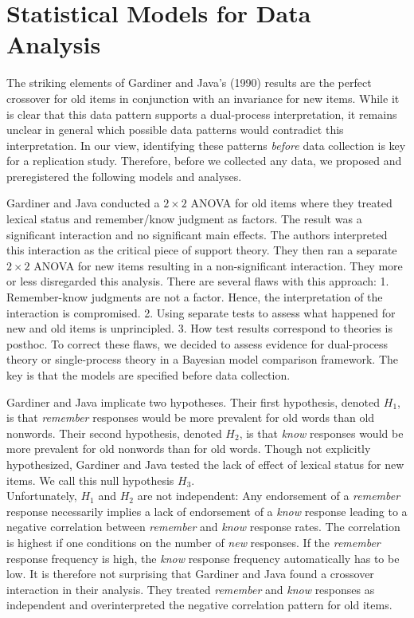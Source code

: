 \documentclass[english,,man]{apa6}
\begin{document}
\hypertarget{statistical-models-for-data-analysis}{%
\section{Statistical Models for Data Analysis}\label{statistical-models-for-data-analysis}}

The striking elements of Gardiner and Java's (1990) results are the perfect crossover for old items in conjunction with an invariance for new items. While it is clear that this data pattern supports a dual-process interpretation, it remains unclear in general which possible data patterns would contradict this interpretation. In our view, identifying these patterns \emph{before} data collection is key for a replication study. Therefore, before we collected any data, we proposed and preregistered the following models and analyses.

Gardiner and Java conducted a \(2\times 2\) ANOVA for old items where they treated lexical status and remember/know judgment as factors. The result was a significant interaction and no significant main effects. The authors interpreted this interaction as the critical piece of support theory. They then ran a separate \(2\times 2\) ANOVA for new items resulting in a non-significant interaction. They more or less disregarded this analysis.
There are several flaws with this approach: 1. Remember-know judgments are not a factor. Hence, the interpretation of the interaction is compromised. 2. Using separate tests to assess what happened for new and old items is unprincipled. 3. How test results correspond to theories is posthoc. To correct these flaws, we decided to assess evidence for dual-process theory or single-process theory in a Bayesian model comparison framework. The key is that the models are specified before data collection.

Gardiner and Java implicate two hypotheses. Their first hypothesis, denoted \(H_1\), is that \emph{remember} responses would be more prevalent for old words than old nonwords. Their second hypothesis, denoted \(H_2\), is that \emph{know} responses would be more prevalent for old nonwords than for old words. Though not explicitly hypothesized, Gardiner and Java tested the lack of effect of lexical status for new items. We call this null hypothesis \(H_3\).\\

Unfortunately, \(H_1\) and \(H_2\) are not independent: Any endorsement of a \emph{remember} response necessarily implies a lack of endorsement of a \emph{know} response leading to a negative correlation between \emph{remember} and \emph{know} response rates. The correlation is highest if one conditions on the number of \emph{new} responses. If the \emph{remember} response frequency is high, the \emph{know} response frequency automatically has to be low. It is therefore not surprising that Gardiner and Java found a crossover interaction in their analysis. They treated \emph{remember} and \emph{know} responses as independent and overinterpreted the negative correlation pattern for old items.
\end{document}
